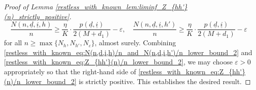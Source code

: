 \begin{proof}[Proof of Lemma \ref{restless_with_known_lem:liminf_Z_{hh'}(n)_strictly_positive}]
\begin{equation}
	\frac{N(n,\underline{d},\underline{i},h)}{n}\geq \frac{\eta}{K}\cdot \frac{p(\underline{d},\underline{i})}{2(M+d_1)}-\varepsilon,\quad \frac{N(n,\underline{d},\underline{i},h')}{n}\geq \frac{\eta}{K}\cdot \frac{p(\underline{d},\underline{i})}{2(M+d_1)}-\varepsilon\label{restless_with_known_eq:N(n,d,i,h)/n_and_N(n,d,i,h')/n_lower_bound_2}
\end{equation}
for all $n\geq \max\{N_h,N_{h'},N_\varepsilon\}$, almost surely. 
Combining \eqref{restless_with_known_eq:N(n,d,i,h)/n_and_N(n,d,i,h')/n_lower_bound_2} and \eqref{restless_with_known_eq:Z_{hh'}(n)/n_lower_bound_2}, we may choose $\varepsilon>0$ appropriately so that the right-hand side of \eqref{restless_with_known_eq:Z_{hh'}(n)/n_lower_bound_2} is strictly positive. This establishes the desired result.
\end{proof}

